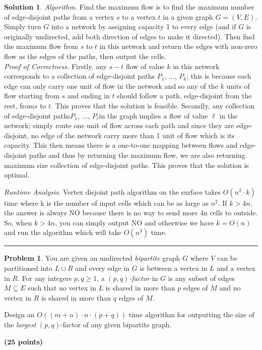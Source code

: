 \documentclass{article}
\theoremstyle{definition}
\newtheorem{problem}{Problem}
\def\fline{\rule{0.75\linewidth}{0.5pt}}
\newcommand{\finishline}{\begin{center}\fline\end{center}}
\newtheorem*{solution*}{Solution}
\newenvironment{solution}{\begin{solution*}}{{\finishline} \end{solution*}}
\newcommand{\grade}[1]{\hfill{\textbf{($\mathbf{#1}$ points)}}}
\begin{document}
\begin{solution}

	\emph{Algorithm.} Find the maximum flow is to find the maximum  number  of  edge-disjoint  paths from a vertex $s$ to a vertex $t$ in a given graph $G= (V, E)$. Simply  turn $G$ into  a  network  by  assigning  capacity  1  to  every  edge  (and  if $G$ is  originally undirected, add both direction of edges to make it directed).  Then find the maximum flow from $s$ to $t$ in this network and return the edges with non-zero flow as the edges of the paths, then output the cells. \\
	
	\emph{Proof of Correctness.} Firstly,  any $s-t$ flow  of  value $k$ in  this  network  corresponds  to  a  collection  of  edge-disjoint  paths $P_1$, ..., $P_k$; this is because each edge can only carry one unit of flow in the network and so any of the $k$ units of flow starting from $s$ and ending in $t$ should follow a path, edge-disjoint from the rest, from$s$ to $t$.  This proves that the solution is feasible. Secondly, any collection of edge-disjoint paths$P_1$, ..., $P_\ell$in the graph implies a flow of value $\ell$ in the network; simply route one unit of flow across each path and since they are edge-disjoint, no edge of the network carry more than 1 unit of flow which is its capacity.  This then means there is a one-to-one mapping between flows and edge-disjoint paths and thus by returning the maximum flow, we are also returning maximum size collection of edge-disjoint paths.  This proves that the solution is optimal.
	
	\emph{Runtime Analysis.} Vertex disjoint path algorithm on the surface takes $O(n^2 \cdot k)$ time where k is the number of input cells which can be as large as $n^2$. If $k > 4n$, the answer is always NO because there is no way to send more 4n cells to outside. So, when $k > 4n$, you can simply output NO and otherwise we have $k = O(n)$ and run the algorithm which will take $O(n^3)$ time. \\


\end{solution}

\bigskip


\begin{problem}
	You are given an undirected \emph{bipartite} graph $G$ where $V$ can be partitioned into $L \cup R$ and every edge in $G$ is between a vertex in $L$ and a vertex in $R$. 
	For any integers $p,q \geq 1$, a \emph{$(p,q)$-factor} in $G$ is any subset of edges $M \subseteq E$ such that no vertex in $L$ is shared in more than $p$ edges of $M$ and no vertex in $R$ is shared in more than $q$ edges of $M$. 
	
Design an $O((m+n) \cdot n \cdot (p+q))$ time algorithm for outputting the size of the \emph{largest} $(p,q)$-factor of any given bipartite graph. 
		
\grade{25}

\end{problem}
\end{document}
